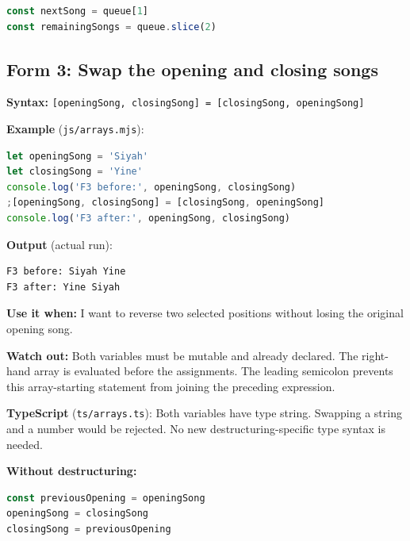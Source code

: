 \documentclass[
  10pt,
  a4paper,
  titlepage]{article}
\newcommand{\passthrough}[1]{#1}
\begin{document}
\Needspace{41.2pt}
\begin{lstlisting}[language=JavaScript]
const nextSong = queue[1]
const remainingSongs = queue.slice(2)
\end{lstlisting}

\subsection{Form 3: Swap the opening and closing
songs}\label{form-3-swap-the-opening-and-closing-songs}

\textbf{Syntax:}
\passthrough{\lstinline![openingSong, closingSong] = [closingSong, openingSong]!}


\textbf{Example} (\passthrough{\lstinline!js/arrays.mjs!}):

\Needspace{72.1pt}
\begin{lstlisting}[language=JavaScript]
let openingSong = 'Siyah'
let closingSong = 'Yine'
console.log('F3 before:', openingSong, closingSong)
;[openingSong, closingSong] = [closingSong, openingSong]
console.log('F3 after:', openingSong, closingSong)
\end{lstlisting}


\textbf{Output} (actual run):

\Needspace{41.2pt}
\begin{lstlisting}
F3 before: Siyah Yine
F3 after: Yine Siyah
\end{lstlisting}

\textbf{Use it when:} I want to reverse two selected positions without
losing the original opening song.

\textbf{Watch out:} Both variables must be mutable and already declared.
The right-hand array is evaluated before the assignments. The leading
semicolon prevents this array-starting statement from joining the
preceding expression.

\textbf{TypeScript} (\passthrough{\lstinline!ts/arrays.ts!}): Both
variables have type string. Swapping a string and a number would be
rejected. No new destructuring-specific type syntax is needed.


\textbf{Without destructuring:}

\Needspace{51.5pt}
\begin{lstlisting}[language=JavaScript]
const previousOpening = openingSong
openingSong = closingSong
closingSong = previousOpening
\end{lstlisting}
\end{document}
